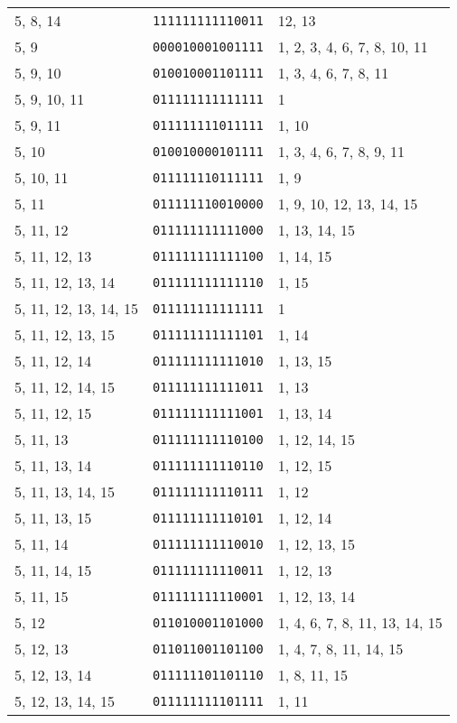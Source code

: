 \documentclass[a4paper,12pt]{article}
\begin{document}
\begin{longtable}{l|l|l}
        5, 8, 14&\texttt{111111111110011}&12, 13\\
        5, 9&\texttt{000010001001111}&1, 2, 3, 4, 6, 7, 8, 10, 11\\
        5, 9, 10&\texttt{010010001101111}&1, 3, 4, 6, 7, 8, 11\\
        5, 9, 10, 11&\texttt{011111111111111}&1\\
        5, 9, 11&\texttt{011111111011111}&1, 10\\
        5, 10&\texttt{010010000101111}&1, 3, 4, 6, 7, 8, 9, 11\\
        5, 10, 11&\texttt{011111110111111}&1, 9\\
        5, 11&\texttt{011111110010000}&1, 9, 10, 12, 13, 14, 15\\
        5, 11, 12&\texttt{011111111111000}&1, 13, 14, 15\\
        5, 11, 12, 13&\texttt{011111111111100}&1, 14, 15\\
        5, 11, 12, 13, 14&\texttt{011111111111110}&1, 15\\
        5, 11, 12, 13, 14, 15&\texttt{011111111111111}&1\\
        5, 11, 12, 13, 15&\texttt{011111111111101}&1, 14\\
        5, 11, 12, 14&\texttt{011111111111010}&1, 13, 15\\
        5, 11, 12, 14, 15&\texttt{011111111111011}&1, 13\\
        5, 11, 12, 15&\texttt{011111111111001}&1, 13, 14\\
        5, 11, 13&\texttt{011111111110100}&1, 12, 14, 15\\
        5, 11, 13, 14&\texttt{011111111110110}&1, 12, 15\\
        5, 11, 13, 14, 15&\texttt{011111111110111}&1, 12\\
        5, 11, 13, 15&\texttt{011111111110101}&1, 12, 14\\
        5, 11, 14&\texttt{011111111110010}&1, 12, 13, 15\\
        5, 11, 14, 15&\texttt{011111111110011}&1, 12, 13\\
        5, 11, 15&\texttt{011111111110001}&1, 12, 13, 14\\
        5, 12&\texttt{011010001101000}&1, 4, 6, 7, 8, 11, 13, 14, 15\\
        5, 12, 13&\texttt{011011001101100}&1, 4, 7, 8, 11, 14, 15\\
        5, 12, 13, 14&\texttt{011111101101110}&1, 8, 11, 15\\
        5, 12, 13, 14, 15&\texttt{011111111101111}&1, 11\\

\end{longtable}
\end{document}
